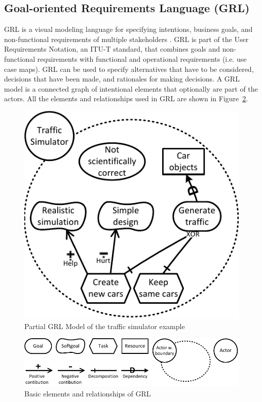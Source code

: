 \subsection{Goal-oriented Requirements Language (GRL)}
\label{sect:background:grl}
GRL is a visual modeling language for specifying intentions, business goals, and non-functional requirements of multiple stakeholders \cite{Amyot:2010:EGM:1841349.1841356}. GRL is part of the User Requirements Notation, an ITU-T standard, that combines goals and non-functional requirements with functional and operational requirements (i.e. use case maps). GRL can be used to specify alternatives that have to be considered, decisions that have been made, and rationales for making decisions. A GRL model is a connected graph of intentional elements that optionally are part of the actors. All the elements and relationships used in GRL are shown in Figure~\ref{fig:grl_legend}.

\begin{figure}[ht]
\centering
\includegraphics[width=\columnwidth]{img/Example1.pdf}
\caption{Partial GRL Model of the traffic simulator example}
\label{fig:example-small}
\end{figure} 

\begin{figure}[ht]
\centering
\includegraphics[scale=0.6]{img/grl_legend}
\caption{Basic elements and relationships of GRL}
\label{fig:grl_legend}
\end{figure}

